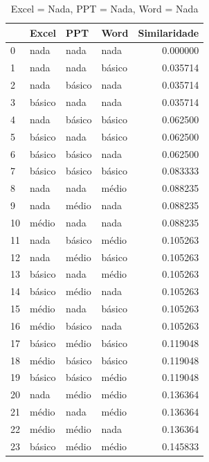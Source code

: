 \documentclass[]{article}
\begin{document}
	\begin{longtable}{|llll|r|} 
		\caption{Excel = Nada, PPT = Nada, Word = Nada}
		\label{variability_impl_mech}
		\endfirsthead
		\endhead
		
		\hline
		{} & Excel     & PPT       & Word      & Similaridade \\
		\hline
		0  & nada      & nada      & nada      & 0.000000     \\
		1  & nada      & nada      & básico   & 0.035714     \\
		2  & nada      & básico   & nada      & 0.035714     \\
		3  & básico   & nada      & nada      & 0.035714     \\
		4  & nada      & básico   & básico   & 0.062500     \\
		5  & básico   & nada      & básico   & 0.062500     \\
		6  & básico   & básico   & nada      & 0.062500     \\
		7  & básico   & básico   & básico   & 0.083333     \\
		8  & nada      & nada      & médio    & 0.088235     \\
		9  & nada      & médio    & nada      & 0.088235     \\
		10 & médio    & nada      & nada      & 0.088235     \\
		11 & nada      & básico   & médio    & 0.105263     \\
		12 & nada      & médio    & básico   & 0.105263     \\
		13 & básico   & nada      & médio    & 0.105263     \\
		14 & básico   & médio    & nada      & 0.105263     \\
		15 & médio    & nada      & básico   & 0.105263     \\
		16 & médio    & básico   & nada      & 0.105263     \\
		17 & básico   & médio    & básico   & 0.119048     \\
		18 & médio    & básico   & básico   & 0.119048     \\
		19 & básico   & básico   & médio    & 0.119048     \\
		20 & nada      & médio    & médio    & 0.136364     \\
		21 & médio    & nada      & médio    & 0.136364     \\
		22 & médio    & médio    & nada      & 0.136364     \\
		23 & básico   & médio    & médio    & 0.145833     \\

\end{longtable}
\end{document}
